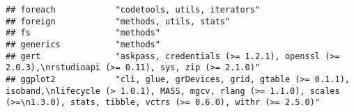 \documentclass[
]{article}
\begin{document}
\begin{verbatim}
## foreach            "codetools, utils, iterators"                                                                                                                                                                                                                                                                                                                                                                                                                
## foreign            "methods, utils, stats"                                                                                                                                                                                                                                                                                                                                                                                                                      
## fs                 "methods"                                                                                                                                                                                                                                                                                                                                                                                                                                    
## generics           "methods"                                                                                                                                                                                                                                                                                                                                                                                                                                    
## gert               "askpass, credentials (>= 1.2.1), openssl (>= 2.0.3),\nrstudioapi (>= 0.11), sys, zip (>= 2.1.0)"                                                                                                                                                                                                                                                                                                                                            
## ggplot2            "cli, glue, grDevices, grid, gtable (>= 0.1.1), isoband,\nlifecycle (> 1.0.1), MASS, mgcv, rlang (>= 1.1.0), scales (>=\n1.3.0), stats, tibble, vctrs (>= 0.6.0), withr (>= 2.5.0)"                                                                                                                                                                                                                                                          

\end{verbatim}
\end{document}
